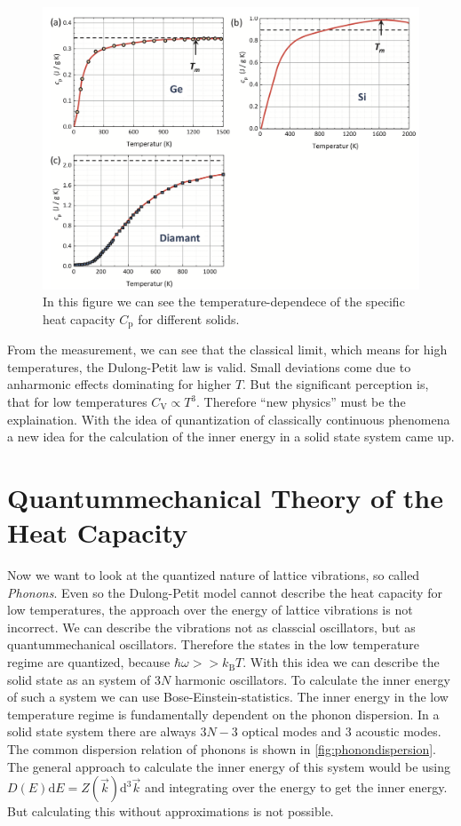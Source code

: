 \begin{figure}
    \centering
    \includegraphics[scale=0.4]{content/V47_pictures/heat_capacity.png}
    \caption{In this figure we can see the temperature-dependece of the specific heat capacity $C_\mathrm{p}$ for different solids. \cite{grossmarx}}
    \label{fig:heat_cap_measurement}
\end{figure}

From the measurement, we can see that the classical limit, which means for high temperatures, the Dulong-Petit law is valid. Small deviations come due to anharmonic effects dominating
for higher $T$. But the significant perception is, that for low temperatures $C_\mathrm{V} \propto T^3$. Therefore \enquote{new physics} must be the explaination. With the idea of qunantization
of classically continuous phenomena a new idea for the calculation of the inner energy in a solid state system came up.

\section{Quantummechanical Theory of the Heat Capacity}
\label{sec:quantum}
Now we want to look at the quantized nature of lattice vibrations, so called \textit{Phonons}. Even so the Dulong-Petit model cannot describe the heat capacity for low temperatures,
the approach over the energy of lattice vibrations is not incorrect. We can describe the vibrations not as classcial oscillators, but as quantummechanical oscillators. Therefore the 
states in the low temperature regime are quantized, because $\hbar\omega >> k_\mathrm{B}T$. With this idea we can describe the solid state as an system of $3N$ harmonic oscillators.
To calculate the inner energy of such a system we can use Bose-Einstein-statistics. The inner energy in the low temperature regime is fundamentally dependent on the phonon dispersion.
In a solid state system there are always $3N - 3$ optical modes and $3$ acoustic modes. The common dispersion relation of phonons is shown in \autoref{fig:phonondispersion}. The general
approach to calculate the inner energy of this system would be using $D(E)\mathrm{d}E = Z(\vec{k})\mathrm{d^3}\vec{k}$ and integrating over the energy to get the inner energy. But 
calculating this without approximations is not possible.

